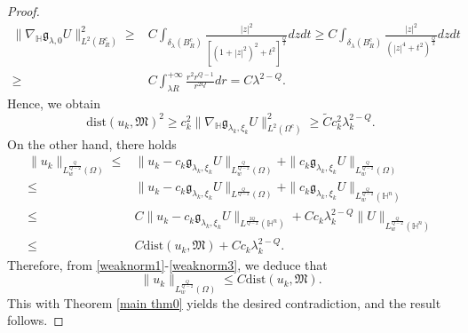 \documentclass[11pt]{article}
\begin{document}
\begin{proof}
\begin{align*}
  \|\nabla_\mathbb{H}\mathfrak{g}_{\lambda,0}U\|^2_{L^2(B_R^c)}\geq& C\int_{\delta_\lambda(B_R^c)}
  \frac{|z|^2}{[(1+|z|^2)^2+t^2]^{\frac{Q}{2}}}dz dt
 \geq  C\int_{\delta_\lambda(B_R^c)}
  \frac{|z|^2}{(|z|^4+t^2)^{\frac{Q}{2}}}dz dt\\
  \geq &C\int_{\lambda R}^{+\infty}
  \frac{r^2r^{Q-1}}{r^{2Q}}dr=C\lambda^{2-Q}.
\end{align*}
Hence, we obtain
\begin{equation}\label{weaknorm2}
  \mathrm{dist}(u_k,\mathfrak{M})^2\geq c_k^2 \|\nabla_\mathbb{H}\mathfrak{g}_{\lambda_k,\xi_k}U\|^2_{L^2(\Omega^c)}\geq \widetilde{C}c_k^2 \lambda_k^{2-Q}.
\end{equation}
On the other hand, there holds
\begin{align}\label{weaknorm3}
  \|u_k\|_{L^{\frac{Q}{Q-2}}_w(\Omega)}\leq & \|u_k-c_k\mathfrak{g}_{\lambda_k,\xi_k}U\|_{L^{\frac{Q}{Q-2}}_w(\Omega)}+\|c_k\mathfrak{g}_{\lambda_k,\xi_k}U\|_{L^{\frac{Q}{Q-2}}_w(\Omega)}
 \nonumber \\ \leq & \|u_k-c_k\mathfrak{g}_{\lambda_k,\xi_k}U\|_{L^{\frac{Q}{Q-2}}(\Omega)}+\|c_k\mathfrak{g}_{\lambda_k,\xi_k}U\|_{L^{\frac{Q}{Q-2}}_w(\mathbb{H}^n)} \nonumber\\
  \leq & C \|u_k-c_k\mathfrak{g}_{\lambda_k,\xi_k}U\|_{L^{\frac{2Q}{Q-2}}(\mathbb{H}^n)}+Cc_k\lambda_k^{2-Q}\|U\|_{L^{\frac{Q}{Q-2}}_w(\mathbb{H}^n)} \nonumber\\
  \leq & C  \mathrm{dist}(u_k,\mathfrak{M})+Cc_k\lambda_k^{2-Q}.
\end{align}
Therefore, from \eqref{weaknorm1}-\eqref{weaknorm3}, we deduce that
\begin{equation*}
  \|u_k\|_{L^{\frac{Q}{Q-2}}_w(\Omega)}\leq C  \mathrm{dist}(u_k,\mathfrak{M}).
\end{equation*}
This with Theorem \ref{main thm0}  yields the desired contradiction, and the result follows.
\end{proof}
\end{document}
